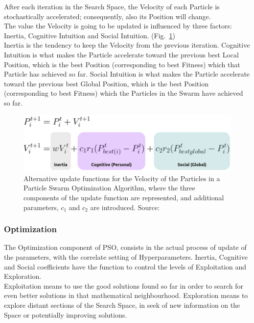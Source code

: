 After each iteration in the Search Space, the Velocity of each Particle is stochastically accelerated; consequently, also its Position will change.
\\[0.3cm]The value the Velocity is going to be updated is influenced by three factors: Inertia, Cognitive Intuition and Social Intuition. (Fig.~\ref{fig:figure-3.2.2})
\\[0.3cm]Inertia is the tendency to keep the Velocity from the previous iteration.
Cognitive Intuition is what makes the Particle accelerate toward the previous best Local Position, which is the best Position (corresponding to best Fitness) which that Particle has achieved so far.
Social Intuition is what makes the Particle accelerate toward the previous best Global Position, which is the best Position (corresponding to best Fitness) which the Particles in the Swarm have achieved so far.
\begin{figure}[t]
	\centering
	\includegraphics[width=13cm]{figures/figure-3.2.2.png}
	\caption[Alternative Update Functions for PSO]{Alternative update functions for the Velocity of the Particles in a Particle Swarm Optimization Algorithm, where the three components of the update function are represented, and additional parameters, $c_1$ and $c_2$ are introduced. Source:~\cite{Tesi-3.2}}
	\label{fig:figure-3.2.2}
\end{figure}

\subsubsection{Optimization}

The Optimization component of PSO, consists in the actual process of update of the parameters, with the correlate setting of Hyperparameters.
Inertia, Cognitive and Social coefficients have the function to control the levels of Exploitation and Exploration.
\\[0.3cm]Exploitation means to use the good solutions found so far in order to search for even better solutions in that mathematical neighbourhood. Exploration means to explore distant sections of the Search Space, in seek of new information on the Space or potentially improving solutions.

